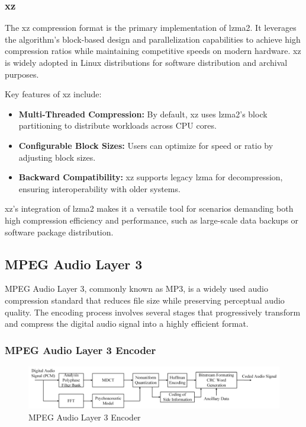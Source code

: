     \subsubsection{xz}
    The xz compression format is the primary implementation of \gls{lzma}2. It leverages the algorithm's block-based design and parallelization capabilities to achieve high compression ratios while maintaining competitive speeds on modern hardware. xz is widely adopted in Linux distributions for software distribution and archival purposes.
    
    Key features of xz include:
    \begin{itemize}
        \item \textbf{Multi-Threaded Compression:} By default, xz uses \gls{lzma}2's block partitioning to distribute workloads across CPU cores.
        \item \textbf{Configurable Block Sizes:} Users can optimize for speed or ratio by adjusting block sizes.
        \item \textbf{Backward Compatibility:} xz supports legacy \gls{lzma} for decompression, ensuring interoperability with older systems.
    \end{itemize}
    
    xz's integration of \gls{lzma}2 makes it a versatile tool for scenarios demanding both high compression efficiency and performance, such as large-scale data backups or software package distribution.
    \subsection{MPEG Audio Layer 3}
    MPEG Audio Layer 3, commonly known as MP3, is a widely used audio compression standard that reduces file size while preserving perceptual audio quality. The encoding process involves several stages that progressively transform and compress the digital audio signal into a highly efficient format.
    
    \subsubsection{MPEG Audio Layer 3 Encoder}
        \begin{figure}[H]
            \centering
            \includegraphics[width=0.95\linewidth]{assets/mp3_encoder.png}
            \caption{MPEG Audio Layer 3 Encoder}
            \label{fig:mp3_encoder}
        \end{figure}

